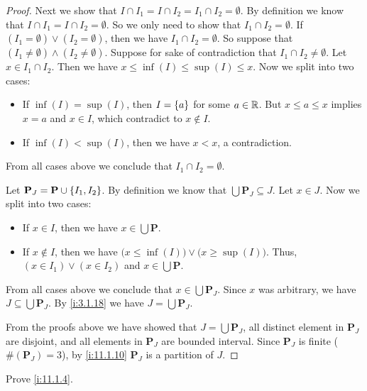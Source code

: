 \begin{proof}
  Next we show that \(I \cap I_1 = I \cap I_2 = I_1 \cap I_2 = \emptyset\).
  By definition we know that \(I \cap I_1 = I \cap I_2 = \emptyset\).
  So we only need to show that \(I_1 \cap I_2 = \emptyset\).
  If \((I_1 = \emptyset) \lor (I_2 = \emptyset)\), then we have \(I_1 \cap I_2 = \emptyset\).
  So suppose that \((I_1 \neq \emptyset) \land (I_2 \neq \emptyset)\).
  Suppose for sake of contradiction that \(I_1 \cap I_2 \neq \emptyset\).
  Let \(x \in I_1 \cap I_2\).
  Then we have \(x \leq \inf(I) \leq \sup(I) \leq x\).
  Now we split into two cases:
  \begin{itemize}
    \item If \(\inf(I) = \sup(I)\), then \(I = \left\lbrace a\right\rbrace\) for some \(a \in \mathbb{R}\).
          But \(x \leq a \leq x\) implies \(x = a\) and \(x \in I\), which contradict to \(x \notin I\).
    \item If \(\inf(I) < \sup(I)\), then we have \(x < x\), a contradiction.
  \end{itemize}
  From all cases above we conclude that \(I_1 \cap I_2 = \emptyset\).

  Let \(\mathbf{P}_J = \mathbf{P} \cup \left\lbrace I_1, I_2\right\rbrace\).
  By definition we know that \(\bigcup \mathbf{P}_J \subseteq J\).
  Let \(x \in J\).
  Now we split into two cases:
  \begin{itemize}
    \item If \(x \in I\), then we have \(x \in \bigcup \mathbf{P}\).
    \item If \(x \notin I\), then we have \(\big(x \leq \inf(I)\big) \lor \big(x \geq \sup(I)\big)\).
          Thus, \((x \in I_1) \lor (x \in I_2)\) and \(x \in \bigcup \mathbf{P}\).
  \end{itemize}
  From all cases above we conclude that \(x \in \bigcup \mathbf{P}_J\).
  Since \(x\) was arbitrary, we have \(J \subseteq \bigcup \mathbf{P}_J\).
  By \cref{i:3.1.18} we have \(J = \bigcup \mathbf{P}_J\).

  From the proofs above we have showed that \(J = \bigcup \mathbf{P}_J\), all distinct element in \(\mathbf{P}_J\) are disjoint, and all elements in \(\mathbf{P}_J\) are bounded interval.
  Since \(\mathbf{P}_J\) is finite (\(\#(\mathbf{P}_J) = 3\)), by \cref{i:11.1.10} \(\mathbf{P}_J\) is a partition of \(J\).
\end{proof}

\exercisesection

\begin{ex}\label{i:ex:11.1.1}
  Prove \cref{i:11.1.4}.
\end{ex}

